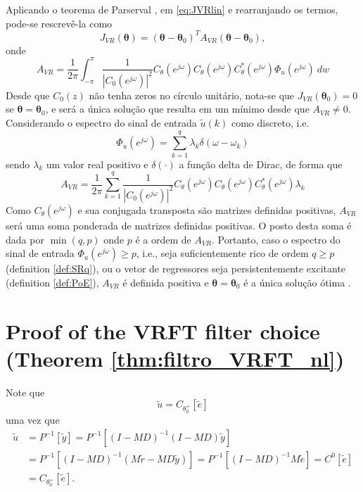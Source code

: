 Aplicando o teorema de Parserval \cite{ljung1999}, em \eqref{eq:JVRlin} e rearranjando os termos, pode-se rescrevê-la como
\begin{equation}
   J_{VR}(\bm{\theta}) = (\bm{\theta} - \bm{\theta}_0)^TA_{VR}(\bm{\theta}-\bm{\theta}_0),
\label{eq:J_AVR}
\end{equation}
onde 
\begin{equation}
   A_{VR} = \frac{1}{2\pi}\int_{-\pi}^{{\pi}} {\frac{1}{|C_0(e^{j\omega})|^2} C_\theta(e^{j\omega})C_\theta(e^{j\omega})C_\theta^{*}(e^{j\omega}) \Phi_u(e^{j\omega})} \: d{w} 
\label{eq:AVR}
\end{equation}
Desde que $C_0(z)$ não tenha zeros no círculo unitário, nota-se que $J_{VR}(\bm{\theta}_0) =0 $ se $\bm{\theta}=\bm{\theta}_0$, e será a única solução que resulta em um mínimo desde que $A_{VR} \neq 0$.
Considerando o espectro do sinal de entrada $\tilde{u}(k)$ como discreto, i.e.
\begin{equation}
   \Phi_u(e^{j\omega}) = \sum_{k=1}^{q} \lambda_k\delta(\omega-\omega_k)
\end{equation}
sendo $\lambda_k$ um valor real positivo e $\delta(\cdot)$ a função delta de Dirac, de forma que
\begin{equation}
   A_{VR} = \frac{1}{2\pi}\sum_{k=1}^{q} {\frac{1}{|C_0(e^{j\omega})|^2} C_\theta(e^{j\omega})C_\theta(e^{j\omega})C_\theta^{*}(e^{j\omega}) \lambda_k} 
\end{equation}
Como $C_\theta(e^{j\omega})$ e sua conjugada transposta são matrizes definidas positivas, $A_{VR}$ será uma soma ponderada de matrizes definidas positivas. O posto desta soma é dada por $\min(q,p)$ onde $p$ é a ordem de $A_{VR}$. Portanto, caso o espectro do sinal de entrada $\Phi_u(e^{j\omega}) \ge p$, i.e., seja suficientemente rico de ordem $q\ge p$ (definition \ref{def:SRq}), ou o vetor de regressores seja persistentemente excitante (definition \ref{def:PoE}), $A_{VR}$ é definida positiva e $\bm{\theta}= \bm{\theta}_0$ é a única solução ótima \citep{bazanella2012}.


\section{ Proof of the VRFT filter choice  (Theorem \ref{thm:filtro_VRFT_nl})}%
\label{sec:prova_da_escolha_do_filtro_vrft}

Note que
\begin{equation}
\tilde{u}=C_{\theta_{0}^{+}}[\tilde{e}]
\label{eq:uTil}
\end{equation}
uma vez que
\begin{align}
   \tilde{u}&=P^{-1}[\tilde{y}]=P^{-1}\left[(I-M D)^{-1}(I-M D) \tilde{y}\right] \nonumber\\
            &= P^{-1}\left[(I-M D)^{-1}(M \tilde{r}-M D \tilde{y})\right]=P^{-1}\left[(I-M D)^{-1} M \tilde{e}\right] = C^{0}[\tilde{e}] \nonumber\\
            &=C_{\theta_{0}^{+}}[\tilde{e}].
\end{align}

